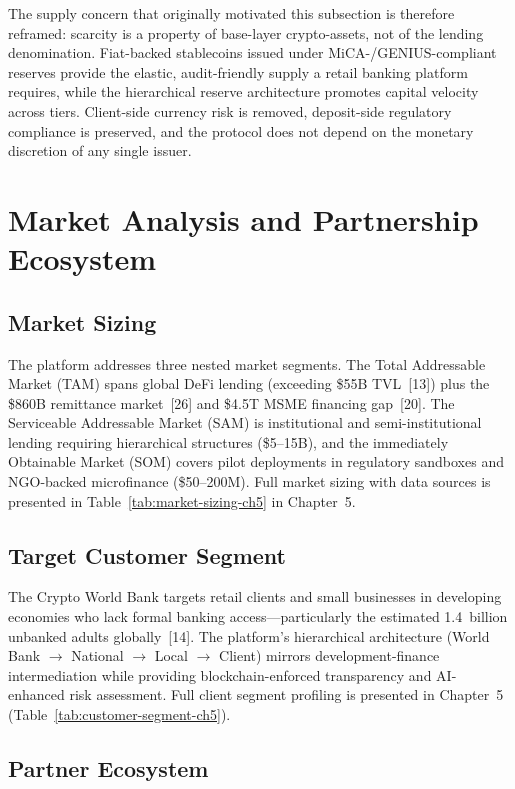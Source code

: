 \documentclass[12pt,a4paper]{report}
\begin{document}
The supply concern that originally motivated this subsection is therefore reframed: scarcity is a property of base-layer crypto-assets, not of the lending denomination. Fiat-backed stablecoins issued under MiCA-/GENIUS-compliant reserves provide the elastic, audit-friendly supply a retail banking platform requires, while the hierarchical reserve architecture promotes capital velocity across tiers. Client-side currency risk is removed, deposit-side regulatory compliance is preserved, and the protocol does not depend on the monetary discretion of any single issuer.

\section{Market Analysis and Partnership Ecosystem}

\subsection{Market Sizing}

The platform addresses three nested market segments. The Total Addressable Market (TAM) spans global DeFi lending (exceeding \$55B TVL~[13]) plus the \$860B remittance market~[26] and \$4.5T MSME financing gap~[20]. The Serviceable Addressable Market (SAM) is institutional and semi-institutional lending requiring hierarchical structures (\$5--15B), and the immediately Obtainable Market (SOM) covers pilot deployments in regulatory sandboxes and NGO-backed microfinance (\$50--200M). Full market sizing with data sources is presented in Table~\ref{tab:market-sizing-ch5} in Chapter~5.

\subsection{Target Customer Segment}

The Crypto World Bank targets retail clients and small businesses in developing economies who lack formal banking access---particularly the estimated 1.4~billion unbanked adults globally~[14]. The platform's hierarchical architecture (World Bank $\to$ National $\to$ Local $\to$ Client) mirrors development-finance intermediation while providing blockchain-enforced transparency and AI-enhanced risk assessment. Full client segment profiling is presented in Chapter~5 (Table~\ref{tab:customer-segment-ch5}).

\subsection{Partner Ecosystem}
\end{document}
